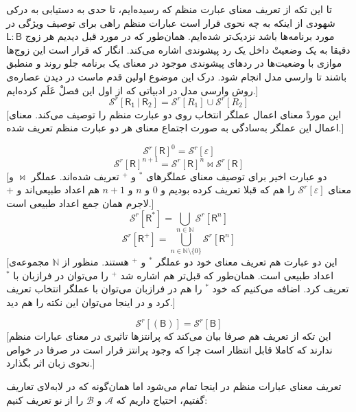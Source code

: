 \begin{defn}
تا این تکه از تعریف معنای عبارت منظم که رسیده‌ایم، تا حدی به دستیابی به درکی شهودی از اینکه به چه نحوی قرار است عبارات منظم راهی برای توصیف ویژگی‌ در مورد برنامه‌ها باشد نزدیک‌تر شده‌ایم. همان‌طور که در مورد قبل دیدیم هر زوج 
$\mathsf{L:B}$
دقیقا به یک وضعیتْ داخل یک رد پیشوندی اشاره می‌کند. انگار که قرار است این زوج‌ها موازی با وضعیت‌ها در ردهای پیشوندی موجود در معنای یک برنامه جلو روند و منطبق باشند تا وارسی مدل انجام شود. درک این موضوع اولین قدم ماست در دیدن عصاره‌ی روش وارسی مدل در ادبیاتی که از اول این فصلْ عَلَم کرده‌ایم.]
$$\mathcal{S}^r [\mathsf{R_1\:|\:R_2}]= 
\mathcal{S}^r [R_1] \cup
\mathcal{S}^r [R_2]$$
[این موردْ معنای اعمال عملگر انتخاب روی دو عبارت منظم را توصیف می‌کند. معنای اعمال این عملگر به‌سادگی به صورت اجتماع معنای هر دو عبارت منظم تعریف شده.]

$$\mathcal{S}^r [\mathsf{R}]^0 = \mathcal{S}^r[\varepsilon]$$
$$\mathcal{S}^r [\mathsf{R}]^{n+1} = \mathcal{S}^r [\mathsf{R}]^{n} \Join
\mathcal{S}^r [\mathsf{R}]$$
[دو عبارت اخیر برای توصیف معنای عملگرهای $^*$ و $^+$ تعریف شده‌اند. عملگر $\Join$ و معنای 
$\mathcal{S}^r[\varepsilon]$
را هم که قبلا تعریف کرده بودیم و $0$ و $n$ و $n+1$ هم اعداد طبیعی‌اند و $+$ لاجرم همان جمع اعداد طبیعی است.]
$$\mathcal{S}^r[\mathsf{R^*}] =  \bigcup_{n \in \mathbb{N}}
\mathcal{S}^r [\mathsf{R}^n]$$
$$\mathcal{S}^r[\mathsf{R^+}] =  \bigcup_{n \in \mathbb{N}\setminus\{0\}}
\mathcal{S}^r [\mathsf{R}^n]$$
[این دو عبارت هم تعریف معنای خود دو عملگر $^*$ و $^+$ هستند. منظور از $\mathbb{N}$ مجموعه‌ی اعداد طبیعی است. همان‌طور که قبل‌تر هم اشاره شد $^+$ را می‌توان در فرازبان با $^*$ تعریف کرد. اضافه می‌کنیم که خود $^*$ را هم در فرازبان می‌توان با عملگر انتخاب تعریف کرد و در اینجا می‌توان این نکته را هم دید.]

$$\mathcal{S}^r [(\mathsf{B})]=\mathcal{S}^r [\mathsf{B}]$$
[این تکه از تعریف هم صرفا بیان می‌کند که پرانتزها تاثیری در معنای عبارات منظم ندارند که کاملا قابل انتظار است چرا که وجود پرانتز قرار است در صرفا در خواص نحوی زبان اثر بگذارد.]
\end{defn}
تعریف معنای عبارات منظم در اینجا تمام می‌شود اما همان‌گونه که در لا‌به‌لای تعاریف گفتیم، احتیاج داریم که $\mathcal{A}$ و $\mathcal{B}$ را از نو تعریف کنیم:

